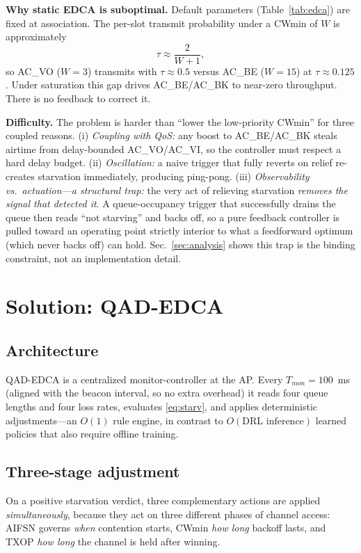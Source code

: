 \documentclass[conference]{IEEEtran}
\newcommand{\AC}[1]{AC\_#1}
\begin{document}
\textbf{Why static EDCA is suboptimal.} Default parameters
(Table~\ref{tab:edca}) are fixed at association. The per-slot transmit
probability under a CWmin of $W$ is approximately
\begin{equation}
\tau \approx \frac{2}{W+1},
\label{eq:tau}
\end{equation}
so \AC{VO} ($W{=}3$) transmits with $\tau\approx0.5$ versus \AC{BE}
($W{=}15$) at $\tau\approx0.125$. Under saturation this gap drives \AC{BE}/\AC{BK}
to near-zero throughput. There is no feedback to correct it.

\textbf{Difficulty.} The problem is harder than ``lower the low-priority
CWmin'' for three coupled reasons. (i) \emph{Coupling with QoS:} any boost to
\AC{BE}/\AC{BK} steals airtime from delay-bounded \AC{VO}/\AC{VI}, so the
controller must respect a hard delay budget. (ii) \emph{Oscillation:} a naive
trigger that fully reverts on relief re-creates starvation immediately,
producing ping-pong. (iii) \emph{Observability vs.\ actuation---a structural
trap:} the very act of relieving starvation \emph{removes the signal that
detected it}. A queue-occupancy trigger that successfully drains the queue
then reads ``not starving'' and backs off, so a pure feedback controller is
pulled toward an operating point strictly interior to what a feedforward
optimum (which never backs off) can hold. Sec.~\ref{sec:analysis} shows this
trap is the binding constraint, not an implementation detail.

\section{Solution: QAD-EDCA}\label{sec:solution}
\subsection{Architecture}
QAD-EDCA is a centralized monitor-controller at the AP. Every
$T_{mon}=100$~ms (aligned with the beacon interval, so no extra overhead) it
reads four queue lengths and four loss rates, evaluates \eqref{eq:starv}, and
applies deterministic adjustments---an $O(1)$ rule engine, in contrast to
$O(\text{DRL inference})$ learned policies that also require offline training.

\subsection{Three-stage adjustment}
On a positive starvation verdict, three complementary actions are applied
\emph{simultaneously}, because they act on three different phases of channel
access: AIFSN governs \emph{when} contention starts, CWmin \emph{how long}
backoff lasts, and TXOP \emph{how long} the channel is held after winning.
\end{document}
